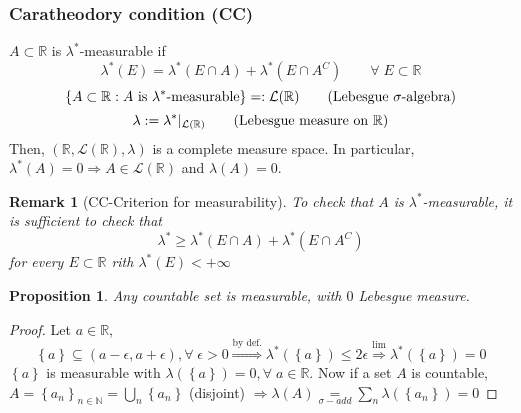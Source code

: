 \documentclass[a4paper,12pt]{article}
\theoremstyle{break}
\newtheorem{proposition}{Proposition}[section]
\newtheorem{remark}[section]{Remark}
\newcommand{\sigalg}{\sigma\mbox{-algebra}}
\newcommand{\real}{\mathbb{R}}
\numberwithin{equation}{section}
\begin{document}
\subsubsection*{Caratheodory condition (CC)}
\(A \subset \real\) is \(\lambda^*\)-measurable if 
\[
    \lambda^*(E) = \lambda^*(E \cap A) + \lambda^*(E \cap A^C) \qquad \forall \; E \subset \real
\]
\[
    \left\lbrace A \subset \real : A \mbox{ is }\lambda^*\mbox{-measurable} \right\rbrace =: \mathcal{L}(\real)
\tag*{(Lebesgue \(\sigalg\))}\]
\[
    \lambda := \lambda^* \vert_{\mathcal{L}(\real)}
\tag*{(Lebesgue measure on \(\real\))}\]
Then, \((\real, \mathcal{L}(\real), \lambda)\) is a complete measure space. In particular, \(\lambda^*(A) = 0 \Longrightarrow A \in \mathcal{L}(\real)\) and \(\lambda(A) = 0\).
\begin{remark}[CC-Criterion for measurability]
    To check that \(A\) is \(\lambda^*\)-measurable, it is sufficient to check that 
    \[
        \lambda^* \geq \lambda^*(E \cap A) + \lambda^*(E \cap A^C)
    \] for every \(E \subset \real\) rith \(\lambda^*(E) < +\infty\)
\end{remark}
\begin{proposition}
    Any countable set is measurable, with \(0\) Lebesgue measure.
\end{proposition}
\begin{proof}
    Let \(a \in \real\), \[\left\lbrace a \right\rbrace \subseteq (a-\epsilon, a+\epsilon), \forall \; \epsilon > 0 \overset{\mbox{by def.}}{\Longrightarrow} \lambda^*(\left\lbrace a \right\rbrace) \leq 2\epsilon \overset{\mbox{lim}}{\Longrightarrow} \lambda^*(\left\lbrace a \right\rbrace) = 0\]
    \(\left\lbrace a \right\rbrace\) is measurable with \(\lambda(\left\lbrace a \right\rbrace) = 0, \forall \; a \in \real\). Now if a set \(A\) is countable, \(A = \left\lbrace a_n \right\rbrace_{n \in \mathbb{N}} = \bigcup_n \left\lbrace a_n \right\rbrace\) (disjoint) \(\Longrightarrow \lambda(A) \underset{\sigma-add}{=} \sum_n \lambda(\left\lbrace a_n \right\rbrace) = 0\)
\end{proof}
\end{document}

